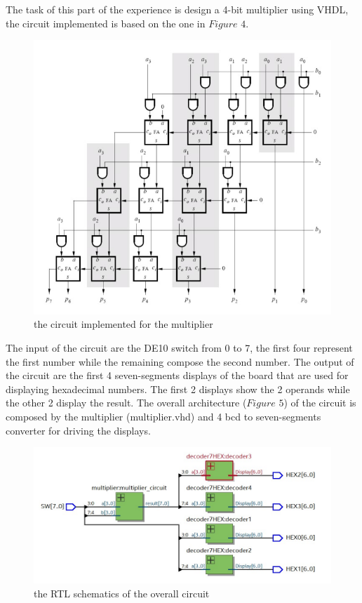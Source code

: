 \documentclass[12pt]{article}
\begin{document}
The task of this part of the experience is design a 4-bit multiplier using VHDL, the circuit implemented is based on the one in $Figure$ $4$. 
\begin{figure}[h]
	\centering
	\includegraphics[scale = 0.4]{immagini/multiplier-circuit.jpg}
	\caption{the circuit implemented for the multiplier}       

\end{figure}
The input of the circuit are the DE10 switch from 0 to 7, the first four represent the first number while the remaining compose the second number.
The output of the circuit are the first 4 seven-segments displays of the board that are used for displaying hexadecimal numbers. The first 2 displays show the 2 operands while the other 2 display the result.
The overall architecture ($Figure$ $5$) of the circuit is composed by the multiplier (multiplier.vhd) and 4 bcd to seven-segments converter for driving the displays.
\begin{figure}[h]
	\centering
	\includegraphics[scale = 0.5]{immagini/RTL_architecture_4.jpg}
	\caption{the RTL schematics of the overall circuit}       

\end{figure}
\end{document}

